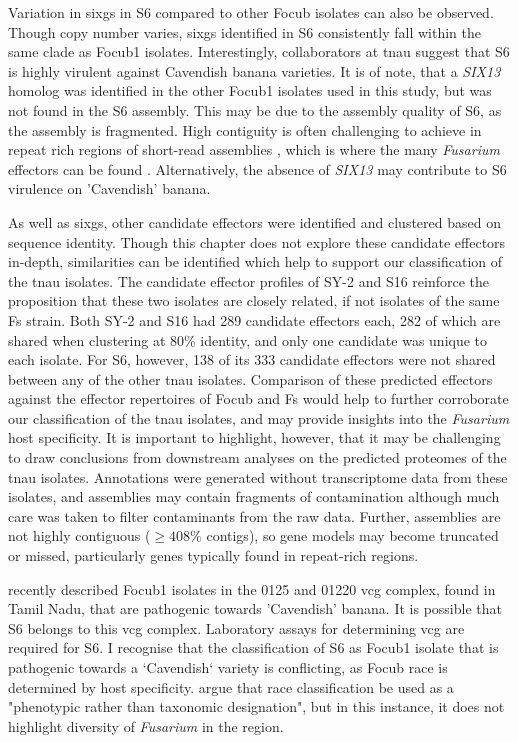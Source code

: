 Variation in \acp{sixg} in S6 compared to other \ac{Focub} isolates can also be observed. Though copy number varies, \acp{sixg} identified in S6 consistently fall within the same clade as \ac{Focub1} isolates. Interestingly, collaborators at \ac{tnau} suggest that S6 is highly virulent against Cavendish banana varieties. It is of note, that a \textit{SIX13} homolog was identified in the other \ac{Focub1} isolates used in this study, but was not found in the S6 assembly. This may be due to the assembly quality of S6, as the assembly is fragmented. High contiguity is often challenging to achieve in repeat rich regions of short-read assemblies \parencite{Treangen2012, Peona2021}, which is where the many \textit{Fusarium} effectors can be found \parencite{Ma2010, Schmidt2013, Armitage2018}. Alternatively, the absence of \textit{SIX13} may contribute to S6 virulence on 'Cavendish' banana. 

As well as \acp{sixg}, other candidate effectors were identified and clustered based on sequence identity. Though this chapter does not explore these candidate effectors in-depth, similarities can be identified which help to support our classification of the \ac{tnau} isolates. The candidate effector profiles of SY-2 and S16 reinforce the proposition that these two isolates are closely related, if not isolates of the same \ac{Fs} strain. Both SY-2 and S16 had 289 candidate effectors each, 282 of which are shared when clustering at 80\% identity, and only one candidate was unique to each isolate. For S6, however, 138 of its 333 candidate effectors were not shared between any of the other \ac{tnau} isolates. Comparison of these predicted effectors against the effector repertoires of \ac{Focub} and \ac{Fs} would help to further corroborate our classification of the \ac{tnau} isolates, and may provide insights into the \textit{Fusarium} host specificity. It is important to highlight, however, that it may be challenging to draw conclusions from downstream analyses on the predicted proteomes of the \ac{tnau} isolates. Annotations were generated without transcriptome data from these isolates, and assemblies may contain fragments of contamination although much care was taken to filter contaminants from the raw data. Further, assemblies are not highly contiguous ($ \geq408\% $ contigs), so gene models may become truncated or missed, particularly genes typically found in repeat-rich regions. 

\textcite{Thangavelu2020} recently described \ac{Focub1} isolates in the 0125 and 01220 \ac{vcg} complex, found in Tamil Nadu, that are pathogenic towards 'Cavendish' banana. It is possible that S6 belongs to this \ac{vcg} complex. Laboratory assays for determining \ac{vcg} are required for S6. I recognise that the classification of S6 as \ac{Focub1} isolate that is pathogenic towards a `Cavendish` variety is conflicting, as \ac{Focub} race is determined by host specificity. \textcite{Torres2021} argue that race classification be used as a "phenotypic rather than taxonomic designation", but in this instance, it does not highlight diversity of \textit{Fusarium} in the region.

